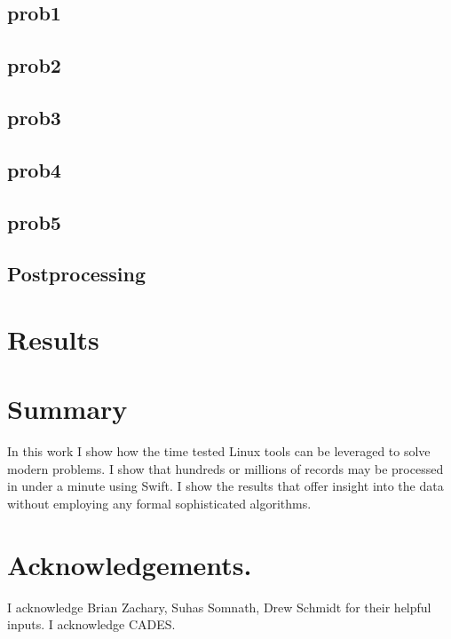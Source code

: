 \documentclass{report}
\begin{document}
\subsection*{prob1}

\subsection*{prob2}

\subsection*{prob3}

\subsection*{prob4}

\subsection*{prob5}

\subsection*{Postprocessing}

\section*{Results}

\section*{Summary}
In this work I show how the time tested Linux tools can be leveraged to solve
modern problems. I show that hundreds or millions of records may be processed
in under a minute using Swift. I show the results that offer insight into the
data without employing any formal sophisticated algorithms.

\section*{Acknowledgements.}
I acknowledge Brian Zachary, Suhas Somnath, Drew Schmidt for their helpful
inputs. I acknowledge CADES.
\end{document}
